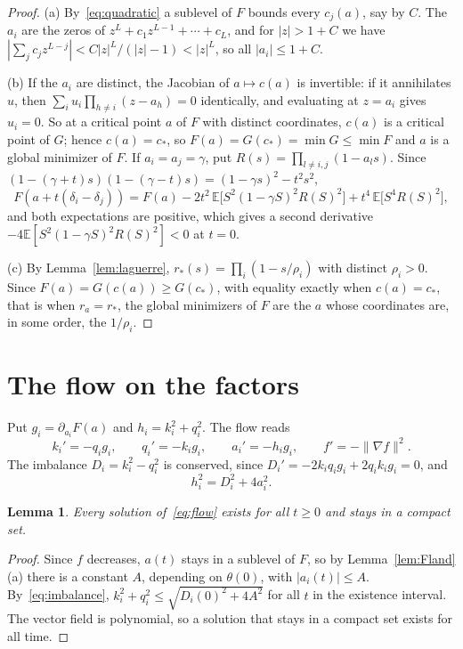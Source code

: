 \documentclass[11pt]{amsart}
\newtheorem{lemma}[theorem]{Lemma}
\theoremstyle{remark}
\numberwithin{equation}{section}
\newcommand{\EE}{\mathbb{E}}
\begin{document}
\begin{proof}
(a) By~\eqref{eq:quadratic} a sublevel of $F$ bounds every $c_j(a)$, say by $C$. The $a_i$ are the zeros of $z^L+c_1z^{L-1}+\cdots+c_L$, and for $|z|>1+C$ we have $|\sum_jc_jz^{L-j}|<C|z|^L/(|z|-1)<|z|^L$, so all $|a_i|\le1+C$.

(b) If the $a_i$ are distinct, the Jacobian of $a\mapsto c(a)$ is invertible: if it annihilates $u$, then $\sum_iu_i\prod_{h\ne i}(z-a_h)=0$ identically, and evaluating at $z=a_i$ gives $u_i=0$. So at a critical point $a$ of $F$ with distinct coordinates, $c(a)$ is a critical point of $G$; hence $c(a)=c_*$, so $F(a)=G(c_*)=\min G\le\min F$ and $a$ is a global minimizer of $F$. If $a_i=a_j=\gamma$, put $R(s)=\prod_{l\ne i,j}(1-a_ls)$. Since $(1-(\gamma+t)s)(1-(\gamma-t)s)=(1-\gamma s)^2-t^2s^2$,
\[
F(a+t(\delta_i-\delta_j))=F(a)-2t^2\,\EE\bigl[S^2(1-\gamma S)^2R(S)^2\bigr]+t^4\,\EE\bigl[S^4R(S)^2\bigr],
\]
and both expectations are positive, which gives a second derivative $-4\EE[S^2(1-\gamma S)^2R(S)^2]<0$ at $t=0$.

(c) By Lemma~\ref{lem:laguerre}, $r_*(s)=\prod_i(1-s/\rho_i)$ with distinct $\rho_i>0$. Since $F(a)=G(c(a))\ge G(c_*)$, with equality exactly when $c(a)=c_*$, that is when $r_a=r_*$, the global minimizers of $F$ are the $a$ whose coordinates are, in some order, the $1/\rho_i$.
\end{proof}

\section{The flow on the factors}\label{sec:flow}
Put $g_i=\partial_{a_i}F(a)$ and $h_i=k_i^2+q_i^2$. The flow reads
\begin{equation}\label{eq:flow}
k_i'=-q_ig_i,\qquad q_i'=-k_ig_i,\qquad a_i'=-h_ig_i,\qquad f'=-\|\nabla f\|^2.
\end{equation}
The imbalance $D_i=k_i^2-q_i^2$ is conserved, since $D_i'=-2k_iq_ig_i+2q_ik_ig_i=0$, and
\begin{equation}\label{eq:imbalance}
h_i^2=D_i^2+4a_i^2.
\end{equation}

\begin{lemma}\label{lem:bounded}
Every solution of~\eqref{eq:flow} exists for all $t\ge0$ and stays in a compact set.
\end{lemma}

\begin{proof}
Since $f$ decreases, $a(t)$ stays in a sublevel of $F$, so by Lemma~\ref{lem:Fland}(a) there is a constant $A$, depending on $\theta(0)$, with $|a_i(t)|\le A$. By~\eqref{eq:imbalance}, $k_i^2+q_i^2\le\sqrt{D_i(0)^2+4A^2}$ for all $t$ in the existence interval. The vector field is polynomial, so a solution that stays in a compact set exists for all time.
\end{proof}
\end{document}
